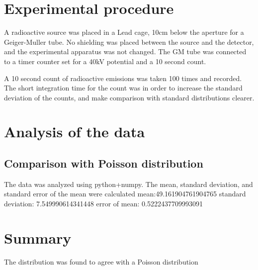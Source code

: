 \documentclass[10pt]{iopart}
\begin{document}
\section{Experimental procedure}

A radioactive source was placed in a Lead cage, 10cm below the aperture for a Geiger-Muller tube. No shielding was placed between the source and the detector, and the experimental apparatus was not changed. The GM tube was connected to a timer counter set for a 40kV potential and a 10 second count.

A 10 second count of radioactive emissions was taken 100 times and recorded. The short integration time for the count was in order to increase the standard deviation of the counts, and make comparison with standard distributions clearer.


\section{Analysis of the data}

\subsection{Comparison with Poisson distribution}

The data was analyzed using python+numpy. The mean, standard deviation, and standard error of the mean were calculated
mean:49.161904761904765
standard deviation: 7.549990614341448
error of mean: 0.5222437709993091

    
\section{Summary}

The distribution was found to agree with a Poisson distribution 
\end{document}
